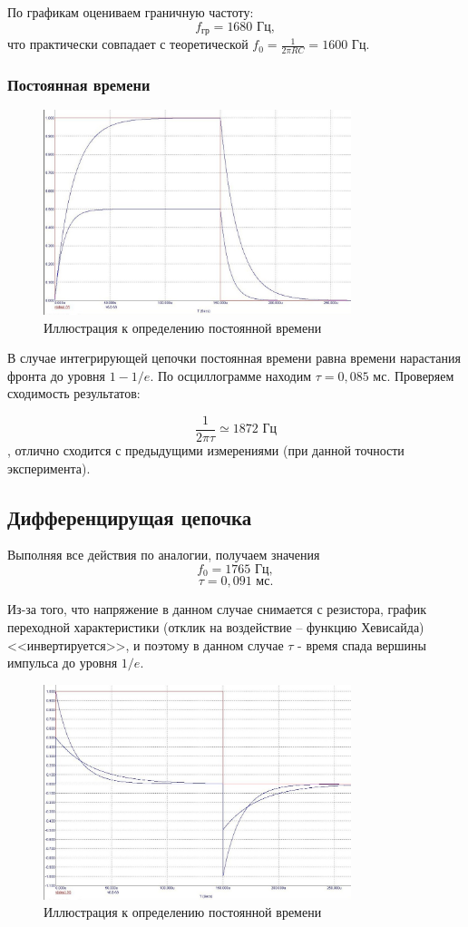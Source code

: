 \documentclass[a4paper, 12pt]{article}
\begin{document}
По графикам оцениваем граничную частоту:
$$f_{\text{гр}} = 1680 \text{ Гц},$$
 что практически совпадает с теоретической $f_0 = \frac{1}{2\pi RC} = 1600$ Гц.
 
\subsubsection*{Постоянная времени}
\begin{figure}[H]
\centering
\includegraphics[width=0.8\textwidth]{inttau}
\caption{Иллюстрация к определению постоянной времени}
\end{figure}

В случае интегрирующей цепочки постоянная времени равна времени нарастания фронта до уровня $1-1/e$. По осциллограмме находим $\tau = 0,085$ мс. Проверяем сходимость результатов:

$$\frac{1}{2\pi \tau} \simeq 1872 \text{ Гц} $$,
отлично сходится с предыдущими измерениями (при данной точности эксперимента).
\subsection*{Дифференцирущая цепочка}

Выполняя все действия по аналогии, получаем значения
$$f_0 = 1765 \text{ Гц},$$
$$\tau = 0,091 \text{ мс}.$$

Из-за того, что напряжение в данном случае снимается с резистора, график переходной характеристики (отклик на воздействие -- функцию Хевисайда) <<инвертируется>>, и поэтому в данном случае $\tau$ - время спада вершины импульса до уровня $1/e$.
\begin{figure}[H]
\centering
\includegraphics[width=0.8\textwidth]{difftau}
\caption{Иллюстрация к определению постоянной времени}
\end{figure}
\end{document}
